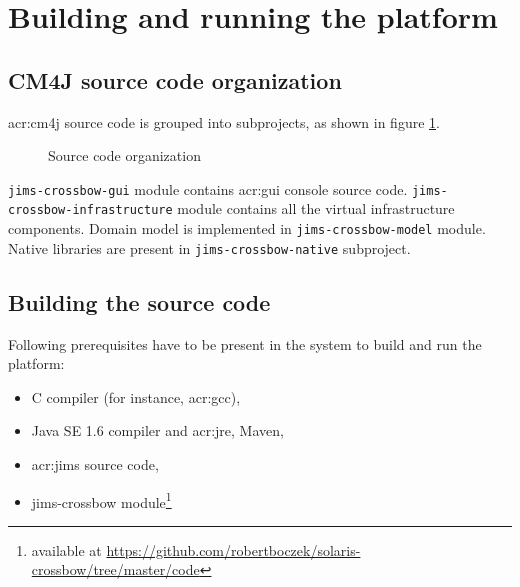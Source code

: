 \documentclass[11pt,openany]{book}
\begin{document}
    \section{Building and running the platform}
    \label{sec:impl:build}

      \subsection{CM4J source code organization}
      \label{sec:impl:structure}

        \gls{acr:cm4j} source code is grouped into subprojects, as shown in figure \ref{fig:impl:org}.

        \begin{figure}[H]
          \centering
          \parbox{.45\textwidth}{}

          \caption{Source code organization}
          \label{fig:impl:org}
        \end{figure}

        \texttt{jims-crossbow-gui} module contains \gls{acr:gui} console source code.
        \texttt{jims-crossbow-infrastructure} module contains all the virtual infrastructure components. Domain model is
        implemented in \texttt{jims-crossbow-model} module. Native libraries are present in
        \texttt{jims-crossbow-native} subproject.


      \subsection{Building the source code}

        Following prerequisites have to be present in the system to build and run the platform:

        \begin{itemize}
          \item C compiler (for instance, \gls{acr:gcc}),
          \item Java SE 1.6 compiler and \gls{acr:jre}, Maven,
          \item \gls{acr:jims} source code,
          \item jims-crossbow module\footnote{available at
                \url{https://github.com/robertboczek/solaris-crossbow/tree/master/code}}
        \end{itemize}
\end{document}
